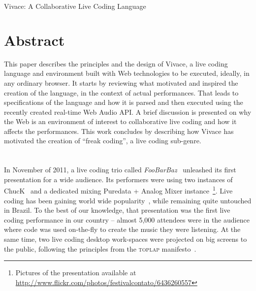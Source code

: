 \documentclass[letterpaper, 12pt]{article}
\begin{document}

\vspace*{24pt}


 {\cmjTitle Vivace: A Collaborative Live Coding Language}


\section*{Abstract}

This paper describes the principles and the design of Vivace, a live
coding language and environment built with Web technologies to be
executed, ideally, in any ordinary browser. It starts by reviewing
what motivated and inspired the creation of the language, in the
context of actual performances. That leads to specifications of the
language and how it is parsed and then executed using the recently
created real-time Web Audio API. A brief discussion is presented on
why the Web is an environment of interest to collaborative live coding
and how it affects the performances. This work concludes by describing
how Vivace has motivated the creation of ``freak coding'', a live
coding sub-genre.

\section*{} %

In November of 2011, a live coding trio called
\textit{FooBarBaz}~\citep{foobarbaz} unleashed its first presentation
for a wide audience. Its performers were using two instances of
ChucK~\citep*{wang2003chuck} and a dedicated mixing Puredata + Analog
Mixer instance~\footnote{Pictures of the presentation available at
  \url{http://www.flickr.com/photos/festivalcontato/6436260557}}. Live
coding has been gaining world wide popularity~\citep{nilson2007live,
  collins2003live, brown2007a, collins2011live}, while remaining quite
untouched in Brazil. To the best of our knowledge, that presentation
was the first live coding performance in our country -- almost 5,000
attendees were in the audience where code was used on-the-fly to
create the music they were listening. At the same time, two live
coding desktop work-spaces were projected on big screens to the
public, following the principles from the \textsc{toplap}
manifesto~\citep{ward2004live}.
\end{document}
